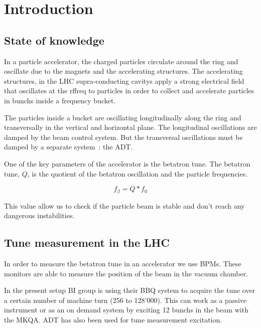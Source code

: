 %

\chapter{Introduction}

\section{State of knowledge}

In a particle accelerator, the charged particles circulate around the ring
and oscillate due to the magnets and the accelerating structures. The 
accelerating structures, in the \gls{LHC} supra-conducting \glspl{cavity} 
apply a strong electrical field that oscillates at the \gls{rffreq} 
to particles in order to collect and accelerate particles in \glspl{bunch} 
inside a frequency \gls{bucket}.

The particles inside a bucket are oscillating longitudinally along the 
ring and transversally in the vertical and horizontal plane. The longitudinal
oscillations are damped by the beam control system. But the transversal
oscillations must be damped by a separate system~: the 
\gls{ADT}\cite{Benews11,Zhabitsky:1141925}.

One of the key parameters of the accelerator is the betatron tune. The 
betatron tune, $Q$, is the quotient of the betatron oscillation and the 
particle frequencies.

$$f_\beta = Q * f_0$$

This value allow us to check if the particle beam is stable and don't reach
any dangerous instabilities.

\section{Tune measurement in the LHC}

In order to measure the betatron tune in an accelerator we use \glspl{BPM}.
These monitors are able to measure the position of the beam in the vacuum 
chamber.

In the present setup \gls{BI} group is using their \gls{BBQ} 
\cite{Boccardi:1156349} system to acquire the tune over a certain number
of machine turn (256 to 128'000). This can work as a passive instrument or as 
an on demand system by exciting 12 \glspl{bunch} in the beam with the 
\gls{MKQA}. \Gls{ADT} has also been used for tune measurement 
excitation\cite{HofleEvian10}. 

